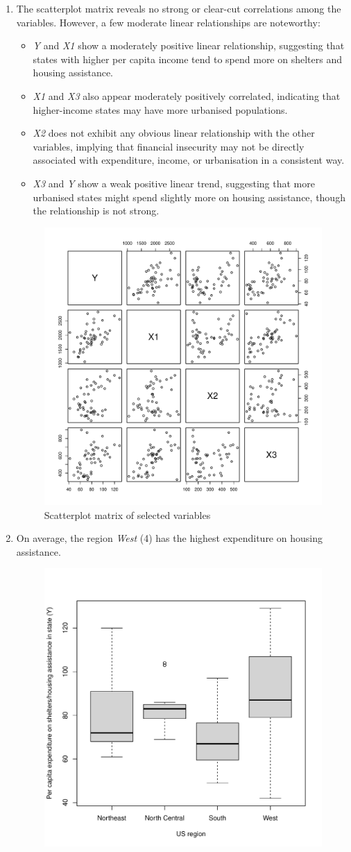 \documentclass[12pt,letterpaper]{article}
\begin{document}
\begin{enumerate}
	\item The scatterplot matrix reveals no strong or clear-cut correlations among the variables. However, a few moderate linear relationships are noteworthy:
		\begin{itemize}
			\item \emph{Y} and \emph{X1} show a moderately positive linear relationship, suggesting that states with higher per capita income tend to spend more on shelters and housing assistance.
			\item \emph{X1} and \emph{X3} also appear moderately positively correlated, indicating that higher-income states may have more urbanised populations.
			\item \emph{X2} does not exhibit any obvious linear relationship with the other variables, implying that financial insecurity may not be directly associated with expenditure, income, or urbanisation in a consistent way.
			\item \emph{X3} and \emph{Y} show a weak positive linear trend, suggesting that more urbanised states might spend slightly more on housing assistance, though the relationship is not strong.
		\end{itemize}
		\begin{figure}[h] 
			\centering
			\includegraphics[width=0.45\linewidth]{pairs_plot_2_1.pdf}
			\caption{Scatterplot matrix of selected variables}
		\end{figure}
		 
	\newpage
	\item On average, the region \textit{West} (4) has the highest expenditure on housing assistance.\\
		\begin{figure}[h] 
			\centering
			\includegraphics[width=0.6\linewidth]{box_plot_2_2.pdf}

\end{figure}
\end{enumerate}
\end{document}
